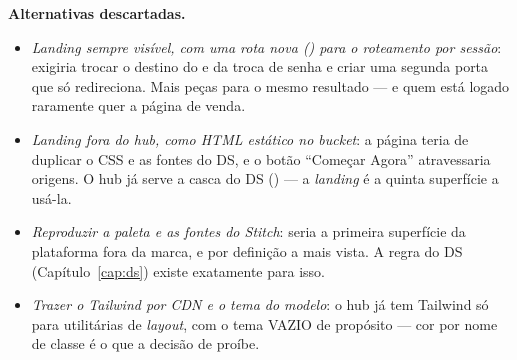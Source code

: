 \textbf{Alternativas descartadas.}
\begin{itemize}
  \item \emph{Landing sempre visível, com uma rota nova () para o
    roteamento por sessão}: exigiria trocar o destino do  e da
    troca de senha e criar uma segunda porta que só redireciona. Mais peças
    para o mesmo resultado --- e quem está logado raramente quer a página de
    venda.
  \item \emph{Landing fora do hub, como HTML estático no \emph{bucket}}: a
    página teria de duplicar o CSS e as fontes do DS, e o botão ``Começar
    Agora'' atravessaria origens. O hub já serve a casca do DS
    () --- a \emph{landing} é a quinta superfície a usá-la.
  \item \emph{Reproduzir a paleta e as fontes do Stitch}: seria a primeira
    superfície da plataforma fora da marca, e por definição a mais vista. A
    regra do DS (Capítulo~\ref{cap:ds}) existe exatamente para isso.
  \item \emph{Trazer o Tailwind por CDN e o tema do modelo}: o hub já tem
    Tailwind só para utilitárias de \emph{layout}, com o tema VAZIO de
    propósito --- cor por nome de classe é o que a decisão de
     proíbe.
\end{itemize}

